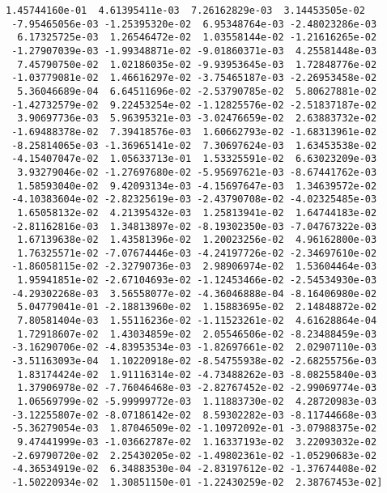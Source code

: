 \documentclass[11pt]{article}
\begin{document}
\begin{Verbatim}[commandchars=\\\{\}]
  1.45744160e-01  4.61395411e-03  7.26162829e-03  3.14453505e-02
 -7.95465056e-03 -1.25395320e-02  6.95348764e-03 -2.48023286e-03
  6.17325725e-03  1.26546472e-02  1.03558144e-02 -1.21616265e-02
 -1.27907039e-03 -1.99348871e-02 -9.01860371e-03  4.25581448e-03
  7.45790750e-02  1.02186035e-02 -9.93953645e-03  1.72848776e-02
 -1.03779081e-02  1.46616297e-02 -3.75465187e-03 -2.26953458e-02
  5.36046689e-04  6.64511696e-02 -2.53790785e-02  5.80627881e-02
 -1.42732579e-02  9.22453254e-02 -1.12825576e-02 -2.51837187e-02
  3.90697736e-03  5.96395321e-03 -3.02476659e-02  2.63883732e-02
 -1.69488378e-02  7.39418576e-03  1.60662793e-02 -1.68313961e-02
 -8.25814065e-03 -1.36965141e-02  7.30697624e-03  1.63453538e-02
 -4.15407047e-02  1.05633713e-01  1.53325591e-02  6.63023209e-03
  3.93279046e-02 -1.27697680e-02 -5.95697621e-03 -8.67441762e-03
  1.58593040e-02  9.42093134e-03 -4.15697647e-03  1.34639572e-02
 -4.10383604e-02 -2.82325619e-03 -2.43790708e-02 -4.02325485e-03
  1.65058132e-02  4.21395432e-03  1.25813941e-02  1.64744183e-02
 -2.81162816e-03  1.34813897e-02 -8.19302350e-03 -7.04767322e-03
  1.67139638e-02  1.43581396e-02  1.20023256e-02  4.96162800e-03
  1.76325571e-02 -7.07674446e-03 -4.24197726e-02 -2.34697610e-02
 -1.86058115e-02 -2.32790736e-03  2.98906974e-02  1.53604464e-03
  1.95941851e-02 -2.67104693e-02 -1.12453466e-02 -2.54534930e-03
 -4.29302268e-03  3.56558077e-02 -4.36046888e-04 -8.16406980e-02
  5.04779041e-01 -2.18813960e-02  1.15883695e-02  2.14848872e-02
  7.80581404e-03  1.55116236e-02 -1.11523261e-02  4.61628864e-04
  1.72918607e-02  1.43034859e-02  2.05546506e-02 -8.23488459e-03
 -3.16290706e-02 -4.83953534e-03 -1.82697661e-02  2.02907110e-03
 -3.51163093e-04  1.10220918e-02 -8.54755938e-02 -2.68255756e-03
  1.83174424e-02  1.91116314e-02 -4.73488262e-03 -8.08255840e-03
  1.37906978e-02 -7.76046468e-03 -2.82767452e-02 -2.99069774e-03
  1.06569799e-02 -5.99999772e-03  1.11883730e-02  4.28720983e-03
 -3.12255807e-02 -8.07186142e-02  8.59302282e-03 -8.11744668e-03
 -5.36279054e-03  1.87046509e-02 -1.10972092e-01 -3.07988375e-02
  9.47441999e-03 -1.03662787e-02  1.16337193e-02  3.22093032e-02
 -2.69790720e-02  2.25430205e-02 -1.49802361e-02 -1.05290683e-02
 -4.36534919e-02  6.34883530e-04 -2.83197612e-02 -1.37674408e-02
 -1.50220934e-02  1.30851150e-01 -1.22430259e-02  2.38767453e-02]

    \end{Verbatim}
\end{document}
